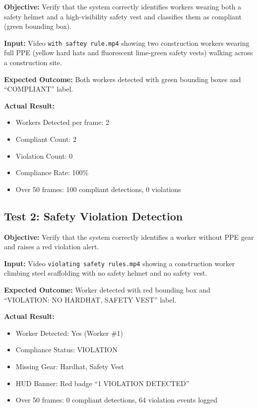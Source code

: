 \documentclass[12pt,a4paper]{report}
\begin{document}
\textbf{Objective:} Verify that the system correctly identifies workers wearing both a safety helmet and a high-visibility safety vest and classifies them as compliant (green bounding box).

\textbf{Input:} Video \texttt{with saftey rule.mp4} showing two construction workers wearing full PPE (yellow hard hats and fluorescent lime-green safety vests) walking across a construction site.

\textbf{Expected Outcome:} Both workers detected with green bounding boxes and ``COMPLIANT'' label.

\textbf{Actual Result:}
\begin{itemize}
    \item Workers Detected per frame: 2
    \item Compliant Count: 2
    \item Violation Count: 0
    \item Compliance Rate: 100\%
    \item Over 50 frames: 100 compliant detections, 0 violations
\end{itemize}

\vspace{0.5cm}
\begin{center}
\end{center}

\subsection{Test 2: Safety Violation Detection}

\textbf{Objective:} Verify that the system correctly identifies a worker without PPE gear and raises a red violation alert.

\textbf{Input:} Video \texttt{violating safety rules.mp4} showing a construction worker climbing steel scaffolding with no safety helmet and no safety vest.

\textbf{Expected Outcome:} Worker detected with red bounding box and ``VIOLATION: NO HARDHAT, SAFETY VEST'' label.

\textbf{Actual Result:}
\begin{itemize}
    \item Worker Detected: Yes (Worker \#1)
    \item Compliance Status: VIOLATION
    \item Missing Gear: Hardhat, Safety Vest
    \item HUD Banner: Red badge ``1 VIOLATION DETECTED''
    \item Over 50 frames: 0 compliant detections, 64 violation events logged
\end{itemize}
\end{document}
